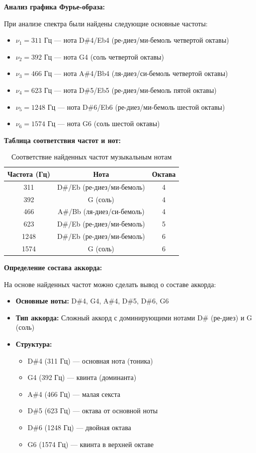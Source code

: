 \textbf{Анализ графика Фурье-образа:}

При анализе спектра были найдены следующие основные частоты:

\begin{itemize}
    \item $\nu_1 = 311$ Гц — нота D\#4/Eb4 (ре-диез/ми-бемоль четвертой октавы)
    \item $\nu_2 = 392$ Гц — нота G4 (соль четвертой октавы)
    \item $\nu_3 = 466$ Гц — нота A\#4/Bb4 (ля-диез/си-бемоль четвертой октавы)
    \item $\nu_4 = 623$ Гц — нота D\#5/Eb5 (ре-диез/ми-бемоль пятой октавы)
    \item $\nu_5 = 1248$ Гц — нота D\#6/Eb6 (ре-диез/ми-бемоль шестой октавы)
    \item $\nu_6 = 1574$ Гц — нота G6 (соль шестой октавы)
\end{itemize}

\textbf{Таблица соответствия частот и нот:}

\begin{table}[H]
\centering
\begin{tabular}{|c|c|c|}
\hline
\textbf{Частота (Гц)} & \textbf{Нота} & \textbf{Октава} \\
\hline
311 & D\#/Eb (ре-диез/ми-бемоль) & 4 \\
392 & G (соль) & 4 \\
466 & A\#/Bb (ля-диез/си-бемоль) & 4 \\
623 & D\#/Eb (ре-диез/ми-бемоль) & 5 \\
1248 & D\#/Eb (ре-диез/ми-бемоль) & 6 \\
1574 & G (соль) & 6 \\
\hline
\end{tabular}
\caption{Соответствие найденных частот музыкальным нотам}
\end{table}

\textbf{Определение состава аккорда:}

На основе найденных частот можно сделать вывод о составе аккорда:

\begin{itemize}
    \item \textbf{Основные ноты:} D\#4, G4, A\#4, D\#5, D\#6, G6
    \item \textbf{Тип аккорда:} Сложный аккорд с доминирующими нотами D\# (ре-диез) и G (соль)
    \item \textbf{Структура:}
    \begin{itemize}
        \item D\#4 (311 Гц) — основная нота (тоника)
        \item G4 (392 Гц) — квинта (доминанта)
        \item A\#4 (466 Гц) — малая секста
        \item D\#5 (623 Гц) — октава от основной ноты
        \item D\#6 (1248 Гц) — двойная октава
        \item G6 (1574 Гц) — квинта в верхней октаве
    \end{itemize}
\end{itemize}

